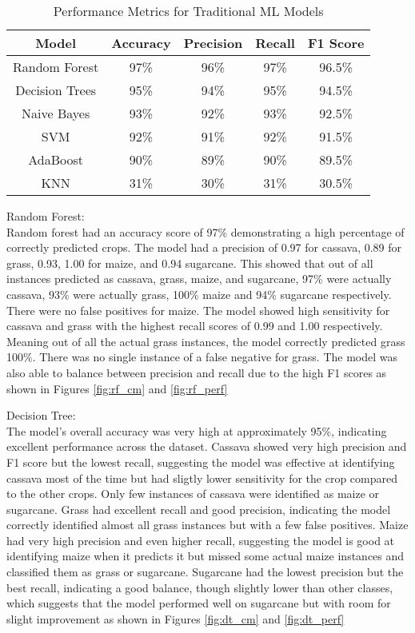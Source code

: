\documentclass[10pt,twocolumn,letterpaper]{article}
\begin{document}
\begin{table}[h]
    \centering
    \begin{tabular}{|c|c|c|c|c|}
        \hline
        \textbf{Model} & \textbf{Accuracy} & \textbf{Precision} & \textbf{Recall} & \textbf{F1 Score} \\
        \hline
        Random Forest & 97\% & 96\% & 97\% & 96.5\% \\
        Decision Trees & 95\% & 94\% & 95\% & 94.5\% \\
        Naive Bayes & 93\% & 92\% & 93\% & 92.5\% \\
        SVM & 92\% & 91\% & 92\% & 91.5\% \\
        AdaBoost & 90\% & 89\% & 90\% & 89.5\% \\
        KNN & 31\% & 30\% & 31\% & 30.5\% \\
        \hline
    \end{tabular}
    \caption{Performance Metrics for Traditional ML Models}
    \label{tab:performance}
\end{table}

Random Forest: \\
Random forest had an accuracy score of 97\% demonstrating a high percentage of correctly predicted crops. The model had a precision of 0.97 for cassava, 0.89 for grass, 0.93, 1.00 for maize, and 0.94 sugarcane. This showed that out of all instances predicted as cassava, grass, maize, and sugarcane, 97\% were actually cassava, 93\% were actually grass, 100\% maize and 94\% sugarcane respectively. There were no false positives for maize. The model showed high sensitivity for cassava and grass with the highest recall scores of 0.99 and 1.00 respectively. Meaning out of all the actual grass instances, the model correctly predicted grass 100\%. There was no single instance of a false negative for grass. The model was also able to balance between precision and recall due to the high F1 scores as shown in Figures \ref{fig:rf_cm} and \ref{fig:rf_perf}


Decision Tree: \\
The model's overall accuracy was very high at approximately 95\%, indicating excellent performance across the dataset. Cassava showed very high precision and F1 score but the lowest recall, suggesting the model was effective at identifying cassava most of the time but had sligtly lower sensitivity for the crop compared to the other crops. Only few instances of cassava were identified as maize or sugarcane. Grass had excellent recall and good precision, indicating the model correctly identified almost all grass instances but with a few false positives. Maize had very high precision and even higher recall, suggesting the model is good at identifying maize when it predicts it but missed some actual maize instances and classified them as grass or sugarcane. Sugarcane had the lowest precision but the best recall, indicating a good balance, though slightly lower than other classes, which suggests that the model performed well on sugarcane but with room for slight improvement as shown in Figures \ref{fig:dt_cm} and \ref{fig:dt_perf}
\end{document}
